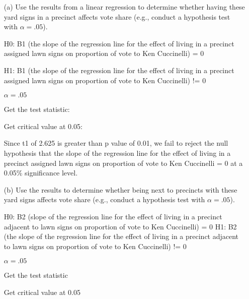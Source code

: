 \documentclass[12pt,letterpaper]{article}
\begin{document}
\vspace{.5cm}
\begin{enumerate}
	\item [(a)] Use the results from a linear regression to determine whether having these yard signs in a precinct affects vote share (e.g., conduct a hypothesis test with $\alpha = .05$).
	
	H0: B1 (the slope of the regression line for the effect of living in a precinct 
	assigned lawn signs on proportion of vote to Ken Cuccinelli) = 0
	
	H1: B1 (the slope of the regression line for the effect of living in a precinct 
	assigned lawn signs on proportion of vote to Ken Cuccinelli) != 0
	
	$\alpha = .05$

	\newpage
	\noindent Get the test statistic:
	
	
	\vspace{.1cm}
	
	\noindent Get critical value at 0.05:
	
	
	\vspace{.1cm}
	
	\noindent Since t1 of 2.625 is greater than p value of 0.01, we fail to reject the null 
	hypothesis that the slope of the regression line for the effect of living in a precinct 
	assigned lawn signs on proportion of vote to Ken Cuccinelli  = 0 at a 0.05\% significance level. 
	
	\item [(b)]  Use the results to determine whether being
	next to precincts with these yard signs affects vote
	share (e.g., conduct a hypothesis test with $\alpha = .05$).
	
	H0: B2 (slope of the regression line for the effect of living in a precinct 
	adjacent to lawn signs on proportion of vote to Ken Cuccinelli) = 0
	H1: B2 (the slope of the regression line for the effect of living in a precinct 
	adjacent to lawn signs on proportion of vote to Ken Cuccinelli) != 0
	
		$\alpha = .05$
	
	Get the test statistic 
	
	
\vspace{.1cm}
	
	Get critical value at 0.05
	

\end{enumerate}
\end{document}
